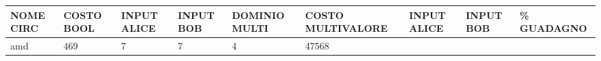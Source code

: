 \documentclass[
]{book}
\begin{document}
\begin{longtable}[]{@{}lllllllll@{}}
\toprule
\begin{minipage}[b]{0.07\columnwidth}\raggedright
NOME CIRC\strut
\end{minipage} & \begin{minipage}[b]{0.11\columnwidth}\raggedright
COSTO BOOL\strut
\end{minipage} & \begin{minipage}[b]{0.08\columnwidth}\raggedright
INPUT ALICE\strut
\end{minipage} & \begin{minipage}[b]{0.07\columnwidth}\raggedright
INPUT BOB\strut
\end{minipage} & \begin{minipage}[b]{0.09\columnwidth}\raggedright
DOMINIO MULTI\strut
\end{minipage} & \begin{minipage}[b]{0.12\columnwidth}\raggedright
COSTO MULTIVALORE\strut
\end{minipage} & \begin{minipage}[b]{0.08\columnwidth}\raggedright
INPUT ALICE\strut
\end{minipage} & \begin{minipage}[b]{0.07\columnwidth}\raggedright
INPUT BOB\strut
\end{minipage} & \begin{minipage}[b]{0.07\columnwidth}\raggedright
\% GUADAGNO\strut
\end{minipage}\tabularnewline
\midrule
\endhead
\begin{minipage}[t]{0.07\columnwidth}\raggedright
amd\strut
\end{minipage} & \begin{minipage}[t]{0.11\columnwidth}\raggedright
469\strut
\end{minipage} & \begin{minipage}[t]{0.08\columnwidth}\raggedright
7\strut
\end{minipage} & \begin{minipage}[t]{0.07\columnwidth}\raggedright
7\strut
\end{minipage} & \begin{minipage}[t]{0.09\columnwidth}\raggedright
4\strut
\end{minipage} & \begin{minipage}[t]{0.12\columnwidth}\raggedright
47568\strut
\end{minipage} & \begin{minipage}[t]{0.08\columnwidth}\raggedright

\end{minipage}
\end{longtable}
\end{document}
